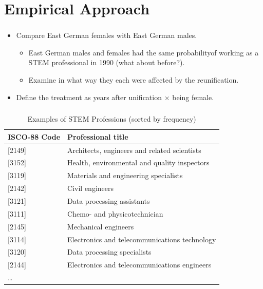 \documentclass[11pt, aspectratio=1610, xcolor={dvipsnames}]{beamer}
\begin{document}
	\section{Empirical Approach}
	\begin{frame}
		\frametitle{}
		
		\begin{itemize}
			\item Compare East German females with East German males.
			\begin{itemize}
				\item East German males and females had the same probability\linebreak of working as a STEM professional in 1990 (what about before?).
				\item Examine in what way they each were affected by the reunification.
			\end{itemize}
			\item Define the treatment as \textcolor{PineGreen}{years after unification $\times$ being female}.
		\end{itemize}
		
		
	\end{frame}

	\begin{frame}
		\frametitle{}
		
		{\linespread{1}\small
			\begin{table}[h]
				\centering
				\caption{Examples of STEM Professions (sorted by frequency)}
				\label{tab:stem_examples}
		
				\begin{tabular}{l l}
					\toprule
					ISCO-88 Code & Professional title\\
					\midrule
					{[2149]} & Architects, engineers and related scientists \\
					{[3152]} & Health, environmental and quality inspectors\\
					{[3119]} & Materials and engineering specialists\\
					{[2142]} & Civil engineers\\
					{[3121]} & Data processing assistants\\
					{[3111]} & Chemo- and physicotechnician\\
					{[2145]} & Mechanical engineers\\
					{[3114]} & Electronics and telecommunications technology\\
					{[3120]} & Data processing specialists\\
					{[2144]} & Electronics and telecommunications engineers\\
					… &\\
					\bottomrule
				\end{tabular}
			\end{table}
		}
		
	\end{frame}
	
\end{document}
